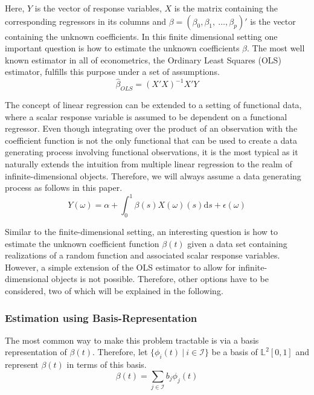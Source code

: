 \documentclass[11pt,twoside,a4paper]{article}
\begin{document}
	Here, $Y$ is the vector of response variables, $X$ is the matrix containing the corresponding regressors in its columns and $\beta = (\beta_0, \beta_1, \: \dots, \beta_p)'$ is the vector containing the unknown coefficients.
	In this finite dimensional setting one important question is how to estimate the unknown coefficients $\beta$. The most well known estimator in all of econometrics, the Ordinary Least Squares (OLS) estimator, fulfills this purpose under a set of assumptions.
	\begin{equation}
		\hat{\beta}_{OLS} = (X'X)^{-1}X'Y
	\end{equation}
	
	The concept of linear regression can be extended to a setting of functional data, where a scalar response variable is assumed to be dependent on a functional regressor. 
	Even though integrating over the product of an observation with the coefficient function is not the only functional that can be used to create a data generating process involving functional observations, it is the most typical as it naturally extends the intuition from multiple linear regression to the realm of infinite-dimensional objects. Therefore, we will always assume a data generating process as follows in this paper.
	\begin{equation}\label{DGP}
		Y(\omega) = \alpha + \int_{0}^{1} \beta(s)X(\omega)(s) \mathrm{d}s + \epsilon(\omega)
	\end{equation}
	
	Similar to the finite-dimensional setting, an interesting question is how to estimate the unknown coefficient function $\beta(t)$ given a data set containing realizations of a random function and associated scalar response variables. However, a simple extension of the OLS estimator to allow for infinite-dimensional objects is not possible. Therefore, other options have to be considered, two of which will be explained in the following.
	
	\subsubsection{Estimation using Basis-Representation}\label{basis_exp_transf}
	The most common way to make this problem tractable is via a basis representation of $\beta(t)$. Therefore, let $\{\phi_i(t) \: \vert \: i \in \mathcal{I}\}$ be a basis of $\mathbb{L}^2[0,1]$ and represent $\beta(t)$ in terms of this basis.
	\begin{equation}
		\beta(t) = \sum_{j \in \mathcal{I}} b_j \phi_j(t)
	\end{equation}
	
\end{document}
